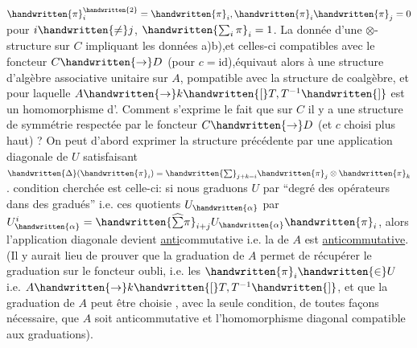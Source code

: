 $\handwritten{\pi}_i^{\handwritten{2}}=\handwritten{\pi}_i,\handwritten{\pi}_i\handwritten{\pi}_j=0$ pour $i\handwritten{\ne}j$, $\handwritten{\sum_i\pi}_i=1$. La donnée d'une $\otimes$-structure sur $C$ impliquant les données a)b),et celles-ci compatibles avec le foncteur $C\handwritten{\to}D$ (pour $c=\mathrm{id}$),équivaut alors à une structure d'algèbre associative unitaire sur $A$, pompatible avec la structure de coalgèbre, et pour laquelle $A\handwritten{\to}k\handwritten{[}T,T^{-1}\handwritten{]}$ est un homomorphisme d'. Comment s'exprime le fait que  sur $C$ il y a une structure de symmétrie  respectée par le foncteur $C\handwritten{\to}D$ (et $c$ choisi plus haut) ? On peut d'abord exprimer la structure\inserted{\handwritten{$\otimes$}} précédente par une application diagonale de $U$ satisfaisant $\handwritten{\Delta}(\handwritten{\pi}_i)=\handwritten{\sum}_{j+k=i}\handwritten{\pi}_j\otimes\handwritten{\pi}_k$.  condition cherchée  est celle-ci: si nous graduons $U$ par ``degré des opérateurs dans des gradués'' i.e.  ces quotients $U_{\handwritten{\alpha}}$ par $U_{\handwritten{\alpha}}^i=\handwritten{\widehat{\sum}\pi}_{i+j}U_{\handwritten{\alpha}}\handwritten{\pi}_i$, alors l'application diagonale devient \uline{anti}commutative i.e. la  de $A$  est \uline{anticommutative}. (Il y aurait lieu de prouver que la graduation de $A$ permet de récupérer le  graduation sur le foncteur oubli, i.e. les $\handwritten{\pi}_i\handwritten{\in}U$ i.e. $A\handwritten{\to}k\handwritten{[}T,T^{-1}\handwritten{]}$, et que la graduation de $A$  peut être choisie , avec la seule condition, de toutes façons nécessaire, que $A$ soit anticommutative et l'homomorphisme diagonal  compatible aux graduations).

